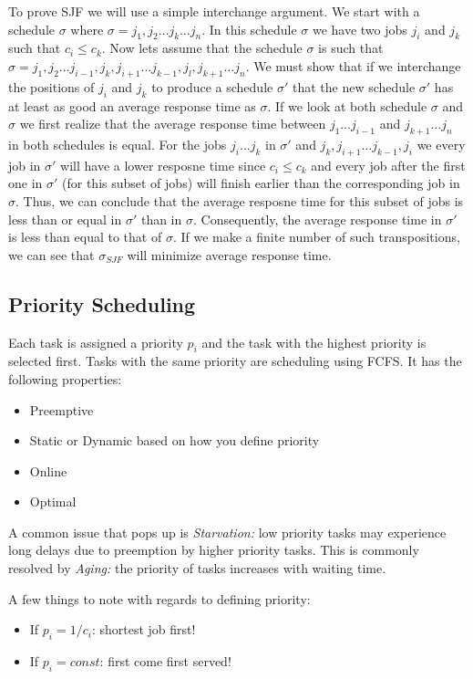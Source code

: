 \documentclass{hw}
\begin{document}
To prove SJF we will use a simple interchange argument. We start with a
schedule $\sigma$ where $\sigma = {j_1, j_2 \dots j_k \dots j_n}.$ In this
schedule $\sigma$ we have two jobs $j_i$ and $j_k$ such that $c_i \leq c_k$.
Now lets assume that the schedule $\sigma$ is such that $\sigma = {j_1, j_2
\dots j_{i-1}, j_k, j_{i+1} \dots j_{k-1}, j_l, j_{k+1} \dots j_n}$. We must
  show that if we interchange the positions of $j_i$ and $j_k$ to produce a
  schedule $\sigma '$ that the new schedule $\sigma '$ has at least as good an
  average response time as $\sigma$. If we look at both schedule $\sigma$ and
  $\sigma$ we first realize that the average response time between $j_1 \dots
  j_{i-1}$ and $j_{k+1} \dots j_n$ in both schedules is equal. For the jobs
  $j_i \dots j_k$ in $\sigma '$ and $j_k, j_{i+1} \dots j_{k-1}, j_i$ we every
  job in $\sigma '$ will have a lower resposne time since $c_i \leq c_k$ and
  every job after the first one in $\sigma '$ (for this subset of jobs) will
  finish earlier than the corresponding job in $\sigma$. Thus, we can conclude
  that the average resposne time for this subset of jobs is less than or equal
  in $\sigma '$ than in $\sigma$. Consequently, the average response time in
  $\sigma '$ is less than equal to that of $\sigma$. If we make a finite number
  of such transpositions, we can see that $\sigma_{SJF}$ will minimize average
  response time. 

  \subsection{Priority Scheduling}
Each task is assigned a priority $p_{i}$ and the task with the highest priority
is selected first. Tasks with the same priority are scheduling using FCFS. It has
the following properties:
\begin{itemize}
  \item Preemptive
  \item Static or Dynamic based on how you define priority
  \item Online
  \item Optimal
\end{itemize}
A common issue that pops up is \emph{Starvation:} low priority tasks may 
experience long delays due to preemption by higher priority tasks. This is 
commonly resolved by \emph{Aging:} the priority of tasks increases with waiting
time.

A few things to note with regards to defining priority:
\begin{itemize}
  \item If $p_{i} = 1/c_{i}$: shortest job first!
  \item If $p_{i} = const$: first come first served!
\end{itemize}
\end{document}
